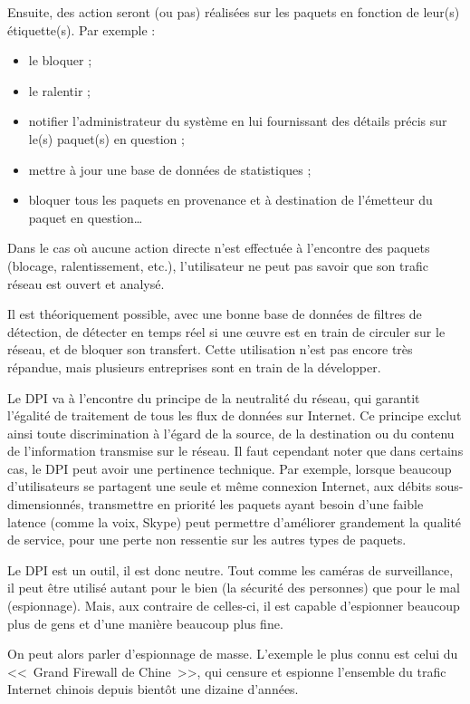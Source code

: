 Ensuite, des action seront (ou pas) réalisées sur les paquets en fonction de leur(s) étiquette(s).
Par exemple :

\begin{itemize}
\item le bloquer ;
\item le ralentir ;
\item notifier l'administrateur du système en lui fournissant des détails précis sur le(s) paquet(s) en question ;
\item mettre à jour une base de données de statistiques ;
\item bloquer tous les paquets en provenance et à destination de l'émetteur du paquet en question\dots{}
\end{itemize}

Dans le cas où aucune action directe n'est effectuée à l'encontre des paquets (blocage, ralentissement, etc.), l'utilisateur ne peut pas savoir que son trafic réseau est ouvert et analysé.

Il est théoriquement possible, avec une bonne base de données de filtres de détection, de détecter en temps réel si une œuvre est en train de circuler sur le réseau, et de bloquer son transfert.
Cette utilisation n'est pas encore très répandue, mais plusieurs entreprises sont en train de la développer.

Le DPI va à l'encontre du principe de la neutralité du réseau, qui garantit l'égalité de traitement de tous les flux de données sur Internet.
Ce principe exclut ainsi toute discrimination à l'égard de la source, de la destination ou du contenu de l'information transmise sur le réseau.
Il faut cependant noter que dans certains cas, le DPI peut avoir une pertinence technique.
Par exemple, lorsque beaucoup d'utilisateurs se partagent une seule et même connexion Internet, aux débits sous-dimensionnés, transmettre en priorité les paquets ayant besoin d'une faible latence (comme la voix, Skype) peut permettre d'améliorer grandement la qualité de service, pour une perte non ressentie sur les autres types de paquets.

Le DPI est un outil, il est donc neutre.
Tout comme les caméras de surveillance, il peut être utilisé autant pour le bien (la sécurité des personnes) que pour le mal (espionnage).
Mais, aux contraire de celles-ci, il est capable d'espionner beaucoup plus de gens et d'une manière beaucoup plus fine.

On peut alors parler d'espionnage de masse.
L'exemple le plus connu est celui du <<~Grand Firewall de Chine~>>, qui censure et espionne l'ensemble du trafic Internet chinois depuis bientôt une dizaine d'années.

